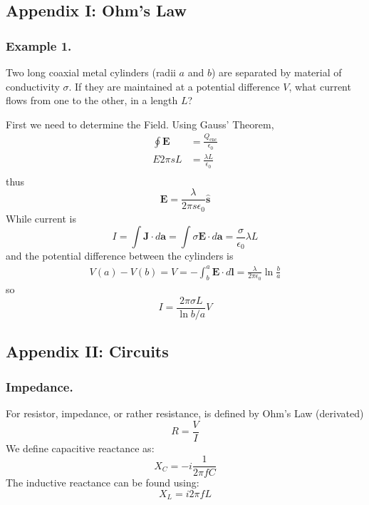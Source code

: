 \documentclass[../../../main.tex]{subfiles}
\begin{document}
\subsection{Appendix I: Ohm's Law}
\subsubsection{Example 1.} Two long coaxial metal cylinders (radii $a$ and $b$) are separated by material of conductivity $\sigma$. If they are maintained at a potential difference $V$, what current ﬂows from one to the other, in a length $L$?

First we need to determine the Field. Using Gauss' Theorem,
\begin{align*}
    \oint \mathbf{E}&=\frac{Q_\text{enc}}{\epsilon_0}\\
    E2\pi sL&=\frac{\lambda L}{\epsilon_0}\\
\end{align*}
thus
\begin{equation*}
    \mathbf{E}=\frac{\lambda}{2\pi s\epsilon_0}\mathbf{\hat{s}}
\end{equation*}
While current is
\begin{equation*}
    I=\int \mathbf{J}\cdot d\mathbf{a}=\int \sigma\mathbf{E}\cdot d\mathbf{a}=\frac{\sigma}{\epsilon_0}\lambda L
\end{equation*}
and the potential difference between the cylinders is
\begin{align*}
    V(a)-V(b)=V=-\int_{b}^{a}\mathbf{E}\cdot d\mathbf{l}=\frac{\lambda}{2\pi\epsilon_0}\ln \frac{b}{a}
\end{align*}
so
\begin{equation*}
    I=\frac{2\pi\sigma L}{\ln b/a}V
\end{equation*}
\begin{figure*}[h]
    \centering
\end{figure*}

\subsection{Appendix II: Circuits}
\subsubsection{Impedance.} For resistor, impedance, or rather resistance, is defined by Ohm's Law (derivated) 
\begin{equation*}
    R=\frac{V}{I}
\end{equation*}
We define capacitive reactance as:
\begin{equation*}
    X_C=-i\frac{1}{2\pi fC}
\end{equation*}
The inductive reactance can be found using:
\begin{equation*}
    X_L=i2\pi f L
\end{equation*}
\end{document}
